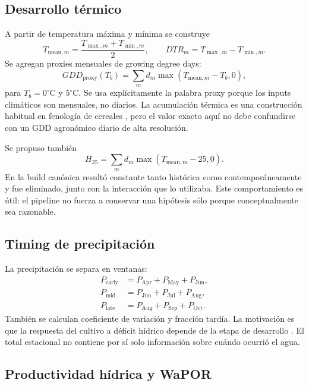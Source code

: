 \subsection{Desarrollo térmico}

A partir de temperatura máxima y mínima se construye
\[
T_{\mathrm{mean},m}=\frac{T_{\max,m}+T_{\min,m}}{2},
\qquad
DTR_m=T_{\max,m}-T_{\min,m}.
\]
Se agregan proxies mensuales de growing degree days:
\begin{equation}
GDD_{\mathrm{proxy}}(T_b)
=
\sum_m d_m\max(T_{\mathrm{mean},m}-T_b,0),
\label{eq:gdd-proxy}
\end{equation}
para $T_b=0^\circ$C y $5^\circ$C. Se usa explícitamente la palabra proxy porque los inputs
climáticos son mensuales, no diarios. La acumulación térmica es una construcción habitual en
fenología de cereales \citep{McMaster1997,McMaster2005,Hajkova2019}, pero el valor exacto aquí
no debe confundirse con un GDD agronómico diario de alta resolución.

Se propuso también
\[
H_{25}
=
\sum_m d_m\max(T_{\mathrm{mean},m}-25,0).
\]
En la build canónica resultó constante tanto histórica como contemporáneamente y fue eliminado,
junto con la interacción que lo utilizaba. Este comportamiento es útil: el pipeline no fuerza
a conservar una hipótesis sólo porque conceptualmente sea razonable.

\subsection{Timing de precipitación}

La precipitación se separa en ventanas:
\begin{align}
P_{\mathrm{early}} &= P_{\mathrm{Apr}}+P_{\mathrm{May}}+P_{\mathrm{Jun}},\\
P_{\mathrm{mid}} &= P_{\mathrm{Jun}}+P_{\mathrm{Jul}}+P_{\mathrm{Aug}},\\
P_{\mathrm{late}} &= P_{\mathrm{Aug}}+P_{\mathrm{Sep}}+P_{\mathrm{Oct}}.
\end{align}
También se calculan coeficiente de variación y fracción tardía. La motivación es que la
respuesta del cultivo a déficit hídrico depende de la etapa de desarrollo
\citep{Bello2022,Mogensen1980,Zhang2015}. El total estacional no contiene por sí solo
información sobre cuándo ocurrió el agua.

\subsection{Productividad hídrica y WaPOR}

